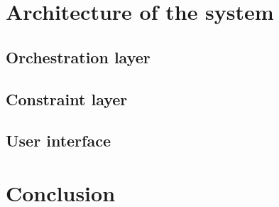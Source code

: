 \section{Architecture of the system}
\doit


\subsection{Orchestration layer}
\doit

\subsection{Constraint layer}
\doit

\subsection{User interface}
\doit

\section{Conclusion}
\doit
